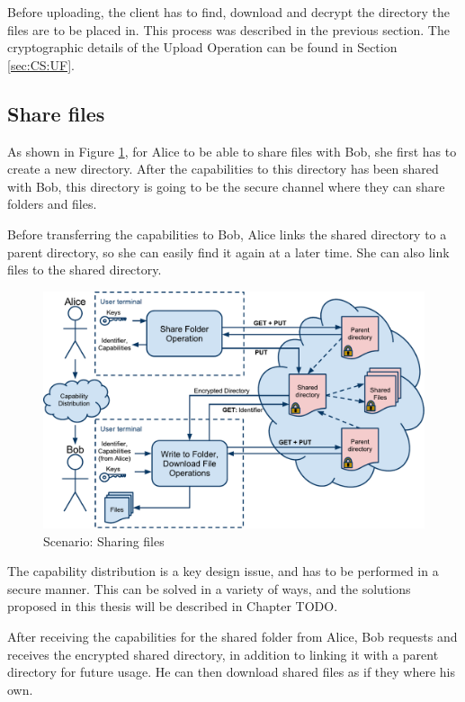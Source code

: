 \documentclass[pdftex,english,10pt,b5paper,twoside]{book}
\begin{document}
Before uploading, the client has to find, download and decrypt the directory the
files are to be placed in. This process was described in the previous section.
The cryptographic details of the Upload Operation can be found in Section
\ref{sec:CS:UF}.

\subsection{Share files}

As shown in Figure \ref{fig:AS:sharing}, for Alice to be able to share files
with Bob, she first has to create a new directory. After the capabilities to
this directory has been shared with Bob, this directory is going to be the
secure channel where they can share folders and files.

Before transferring the capabilities to Bob, Alice links the shared directory to
a parent directory, so she can easily find it again at a later time. She can
also link files to the shared directory.

\begin{figure}[h!]
    \centering
    \includegraphics[width=\columnwidth]{ArchitectureShare.pdf}
    \caption{Scenario: Sharing files}
    \label{fig:AS:sharing}
\end{figure}

The capability distribution is a key design issue, and has to be performed in a
secure manner. This can be solved in a variety of ways, and the solutions
proposed in this thesis will be described in Chapter TODO.

After receiving the capabilities for the shared folder from Alice, Bob requests
and receives the encrypted shared directory, in addition to linking it with a
parent directory for future usage. He can then download shared files as if they
where his own.
\end{document}
